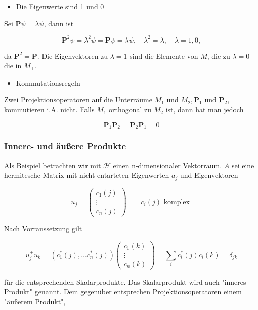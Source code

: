 \documentclass[10pt, letterpaper]{article}
\begin{document}
\begin{itemize}
  \item Die Eigenwerte sind 1 und 0
\end{itemize}

Sei $\mathbf{P} \psi=\lambda \psi$, dann ist

$$
\mathbf{P}^{2} \psi=\lambda^{2} \psi=\mathbf{P} \psi=\lambda \psi, \quad \lambda^{2}=\lambda, \quad \lambda=1,0,
$$

da $\mathbf{P}^{2}=\mathbf{P}$. Die Eigenvektoren zu $\lambda=1$ sind die Elemente von $M$, die zu $\lambda=0$ die in $M_{\perp}$.

\begin{itemize}
  \item Kommutationsregeln
\end{itemize}

Zwei Projektionsoperatoren auf die Unterräume $M_{1}$ und $M_{2}, \mathbf{P}_{1}$ und $\mathbf{P}_{2}$, kommutieren i.A. nicht. Falls $M_{1}$ orthogonal zu $M_{2}$ ist, dann hat man jedoch

$$
\mathbf{P}_{1} \mathbf{P}_{2}=\mathbf{P}_{2} \mathbf{P}_{1}=0
$$

\subsubsection*{Innere- und äußere Produkte}
Als Beispiel betrachten wir mit $\mathcal{H}$ einen n-dimensionaler Vektorraum. $A$ sei eine hermitesche Matrix mit nicht entarteten Eigenwerten $a_{j}$ und Eigenvektoren

$$
u_{j}=\left(\begin{array}{c}
c_{1}(j) \\
\vdots \\
c_{n}(j)
\end{array}\right) \quad \quad c_{i}(j) \text { komplex }
$$

Nach Vorraussetzung gilt

$$
u_{j}^{+} u_{k}=\left(c_{1}^{*}(j), \ldots c_{n}^{*}(j)\right)\left(\begin{array}{c}
c_{1}(k) \\
\vdots \\
c_{n}(k)
\end{array}\right)=\sum_{i} c_{i}^{*}(j) c_{i}(k)=\delta_{j k}
$$

für die entsprechenden Skalarprodukte. Das Skalarprodukt wird auch "inneres Produkt" genannt. Dem gegenüber entsprechen Projektionsoperatoren einem "äußerem Produkt",
\end{document}
